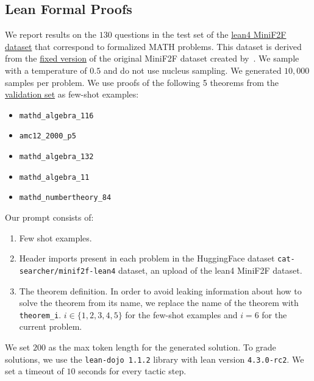 \documentclass[11pt]{article}
\begin{document}
\subsection{Lean Formal Proofs}
We report results on the $130$ questions in the test set of the \href{https://github.com/rah4927/lean-dojo-mew/blob/main/MiniF2F/Test.lean}{lean4 MiniF2F dataset} that correspond to formalized MATH problems. This dataset is derived from the \href{https://github.com/facebookresearch/miniF2F}{fixed version} of the original MiniF2F dataset created by~\citet{zheng2021minif2f}. We sample with a temperature of $0.5$ and do not use nucleus sampling. We generated $10,000$ samples per problem. We use proofs of the following 5 theorems from the \href{https://github.com/rah4927/lean-dojo-mew/blob/main/MiniF2F/Validation.lean}{validation set} as few-shot examples:
\begin{itemize}
    \item \verb|mathd_algebra_116|
    \item \verb|amc12_2000_p5|
    \item \verb|mathd_algebra_132|
    \item \verb|mathd_algebra_11|
    \item \verb|mathd_numbertheory_84|
\end{itemize}


\noindent Our prompt consists of:
\begin{enumerate}
    \item Few shot examples.
    \item Header imports present in each problem in the HuggingFace dataset \verb|cat-searcher/minif2f-lean4| dataset, an upload of the lean4 MiniF2F dataset. 
    \item The theorem definition. In order to avoid leaking information about how to solve the theorem from its name, we replace the name of the theorem with \verb|theorem_i|. $i \in \{1,2,3,4,5\}$ for the few-shot examples and $i=6$ for the current problem. 
\end{enumerate}

We set $200$ as the max token length for the generated solution. To grade solutions, we use the \verb|lean-dojo 1.1.2| library with lean version  \verb|4.3.0-rc2|. We set a timeout of $10$ seconds for every tactic step.
\end{document}
